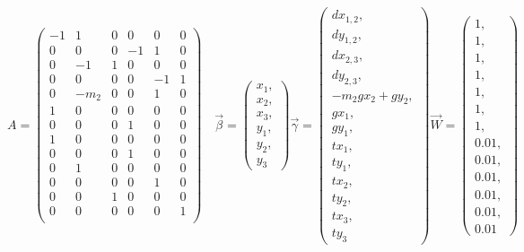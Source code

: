 \documentclass{llncs}
\begin{document}
\[
A =
\begin{pmatrix}
  -1 & 1 & 0 & 0 & 0 & 0\\
  0 & 0 & 0 & -1 & 1 & 0\\
  0 & -1 & 1 & 0 & 0 & 0\\
  0 & 0 & 0 & 0 & -1 & 1\\
  0 & -m_2 & 0 & 0 & 1 & 0\\
  1 & 0 & 0 & 0 & 0 & 0\\
  0 & 0 & 0 & 1 & 0 & 0\\
  1 & 0 & 0 & 0 & 0 & 0\\
  0 & 0 & 0 & 1 & 0 & 0\\
  0 & 1 & 0 & 0 & 0 & 0\\
  0 & 0 & 0 & 0 & 1 & 0\\
  0 & 0 & 1 & 0 & 0 & 0\\
  0 & 0 & 0 & 0 & 0 & 1\\


\end{pmatrix}\quad
\vec{\beta} =
\begin{pmatrix}
  x_1, \\ x_2, \\ x_3, \\ y_1, \\ y_2, \\ y_3
\end{pmatrix}
\vec{\gamma} =
\begin{pmatrix}
  dx_{1,2}, \\ dy_{1,2}, \\ dx_{2,3}, \\ dy_{2,3}, \\ -m_2gx_2 + gy_2,
  \\ gx_1, \\ gy_1, \\ tx_1, \\ ty_1, \\ tx_2, \\ ty_2, \\ tx_3, \\
  ty_3
  
\end{pmatrix}
\vec{W} =
\begin{pmatrix}
  1, \\ 1, \\ 1, \\ 1, \\ 1, \\ 1, \\ 1, \\ 0.01, \\ 0.01, \\ 0.01, \\
  0.01, \\ 0.01, \\ 0.01
\end{pmatrix}
\]
\end{document}
